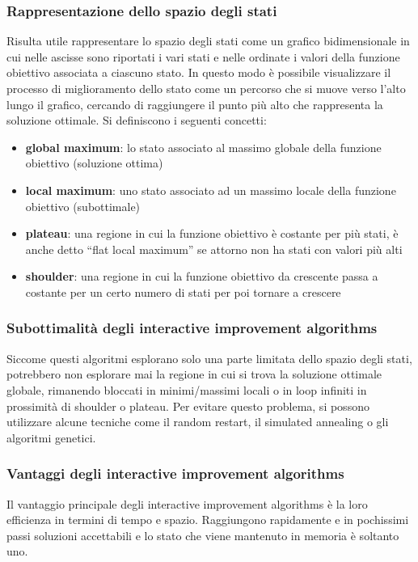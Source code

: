\subsubsection*{Rappresentazione dello spazio degli stati}
Risulta utile rappresentare lo spazio degli stati come un grafico bidimensionale in cui nelle ascisse sono riportati i vari stati
e nelle ordinate i valori della funzione obiettivo associata a ciascuno stato. In questo modo è possibile visualizzare il processo
di miglioramento dello stato come un percorso che si muove verso l'alto lungo il grafico, cercando di raggiungere il punto più
alto che rappresenta la soluzione ottimale. Si definiscono i seguenti concetti:
\begin{itemize}
	\item \textbf{global maximum}: lo stato associato al massimo globale della funzione obiettivo (soluzione ottima)
	\item \textbf{local maximum}: uno stato associato ad un massimo locale della funzione obiettivo (subottimale)
	\item \textbf{plateau}: una regione in cui la funzione obiettivo è costante per più stati, è anche detto ``flat local maximum''
	se attorno non ha stati con valori più alti
	\item \textbf{shoulder}: una regione in cui la funzione obiettivo da crescente passa a costante per un certo numero di stati
	per poi tornare a crescere
\end{itemize}

\subsubsection*{Subottimalità degli interactive improvement algorithms}
Siccome questi algoritmi esplorano solo una parte limitata dello spazio degli stati, potrebbero non esplorare mai la regione
in cui si trova la soluzione ottimale globale, rimanendo bloccati in minimi/massimi locali o in loop infiniti in prossimità di
shoulder o plateau. Per evitare questo problema, si possono utilizzare alcune tecniche come il random restart, il simulated
annealing o gli algoritmi genetici.

\subsubsection*{Vantaggi degli interactive improvement algorithms}
Il vantaggio principale degli interactive improvement algorithms è la loro efficienza in termini di tempo e spazio. Raggiungono
rapidamente e in pochissimi passi soluzioni accettabili e lo stato che viene mantenuto in memoria è soltanto uno.

